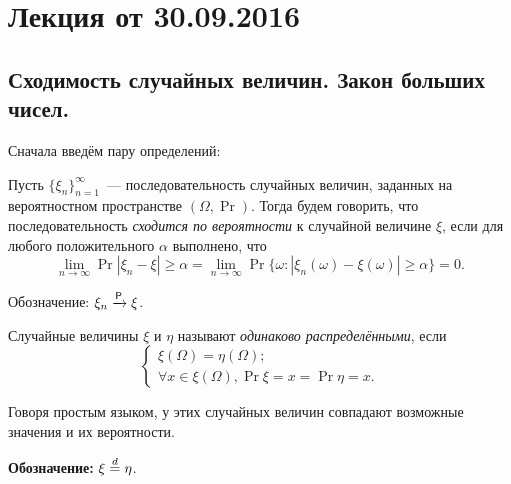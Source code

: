 \section{Лекция от 30.09.2016}

\subsection{Сходимость случайных величин. Закон больших чисел.} 
Сначала введём пару определений:

\begin{definition}
    Пусть \(\{\xi_n\}_{n = 1}^{\infty}\)~--- последовательность случайных величин, заданных на вероятностном пространстве \((\Omega, \Pr)\). Тогда будем говорить, что последовательность \emph{сходится по вероятности} к случайной величине \(\xi\), если для любого положительного \(\alpha\) выполнено, что
    \[\lim\limits_{n \to \infty} \Pr{\left|\xi_n - \xi\right| \geq \alpha} = \lim\limits_{n \to \infty} \Pr{\{\omega : \left|\xi_n(\omega) - \xi(\omega)\right| \geq \alpha\}} = 0.\]
    
    Обозначение: \(\xi_n \prto \xi\).
\end{definition}

\begin{definition}
    Случайные величины \(\xi\) и \(\eta\) называют \emph{одинаково распределёнными}, если 
    \[
    \begin{cases}
    \xi(\Omega) = \eta(\Omega); \\
    \forall x \in \xi(\Omega), \Pr{\xi = x} = \Pr{\eta = x}.
    \end{cases}
    \]
    
    Говоря простым языком, у этих случайных величин совпадают возможные значения и их вероятности.
    
    \textbf{Обозначение:} $\xi \overset{d}{=} \eta$.
\end{definition}

